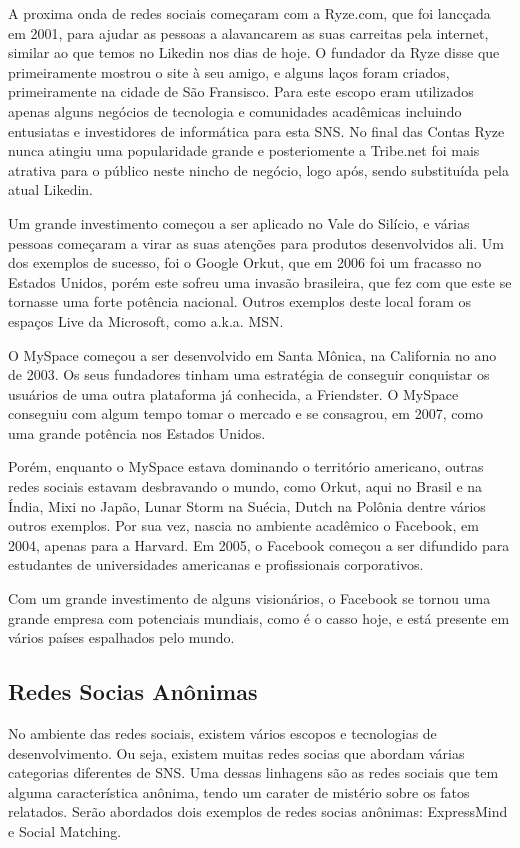 A proxima onda de redes sociais começaram com a Ryze.com, que foi lancçada em 2001,
para ajudar as pessoas a alavancarem as suas carreitas pela internet, similar
ao que temos no Likedin nos dias de hoje. O fundador da Ryze disse que primeiramente mostrou o site à seu amigo,
e alguns laços foram criados, primeiramente na cidade de São Fransisco. Para este
escopo eram utilizados apenas alguns negócios de tecnologia e comunidades acadêmicas
incluindo entusiatas e investidores de informática para esta SNS. No final das
Contas Ryze nunca atingiu uma popularidade grande e posteriomente a Tribe.net foi mais atrativa para o
público neste nincho de negócio, logo após, sendo substituída pela atual Likedin.

Um grande investimento começou a ser aplicado no Vale do Silício, e várias pessoas
começaram a virar as suas atenções para produtos desenvolvidos ali. Um dos exemplos
de sucesso, foi o Google Orkut, que em 2006 foi  um fracasso no Estados Unidos, porém
este sofreu uma invasão brasileira, que fez com que este se tornasse uma forte potência
nacional. Outros exemplos deste local foram os espaços Live da Microsoft, como a.k.a. MSN.

O MySpace começou a ser desenvolvido em Santa Mônica, na California no ano de 2003.
Os seus fundadores tinham uma estratégia de conseguir conquistar os usuários de uma
outra plataforma já conhecida, a  Friendster. O MySpace conseguiu com algum tempo
tomar o mercado e se consagrou, em 2007, como uma grande potência nos Estados Unidos.

Porém, enquanto o MySpace estava dominando o território americano, outras redes sociais
estavam desbravando o mundo, como Orkut, aqui no Brasil e na Índia, Mixi no Japão, 
Lunar Storm na Suécia, Dutch na Polônia dentre vários outros exemplos. Por sua vez, nascia
no ambiente acadêmico o Facebook, em 2004, apenas para a Harvard. Em 2005, o Facebook começou
a ser difundido para estudantes de universidades americanas e profissionais corporativos.

Com um grande investimento de alguns visionários, o Facebook se tornou uma grande empresa
com potenciais mundiais, como é o casso hoje, e está presente em vários países espalhados
pelo mundo.

\subsection{Redes Socias Anônimas}
\label{sec:redesociaisanonimas}
No ambiente das redes sociais, existem vários escopos e tecnologias de desenvolvimento.
Ou seja, existem muitas redes socias que abordam várias categorias diferentes
de SNS. Uma dessas linhagens são as redes sociais que tem alguma característica
anônima, tendo um carater de mistério sobre os fatos relatados. Serão
abordados dois exemplos de redes socias anônimas: ExpressMind e Social Matching.

